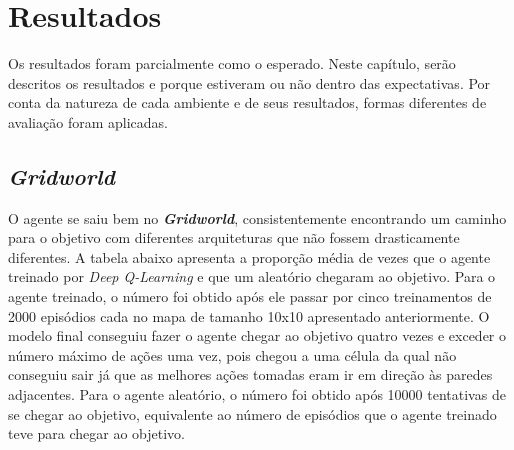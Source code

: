 
\chapter{Resultados}
\label{cap:resultados}

Os resultados foram parcialmente como o esperado.
Neste capítulo, serão descritos os resultados e porque estiveram ou não dentro das expectativas.
Por conta da natureza de cada ambiente e de seus resultados, formas diferentes de avaliação foram aplicadas.

\section{\textit{Gridworld}}
\label{sec:res_gridworld}

O agente se saiu bem no \textbf{\textit{Gridworld}}, consistentemente encontrando um caminho para o objetivo com diferentes arquiteturas que não fossem drasticamente diferentes.
A tabela abaixo apresenta a proporção média de vezes que o agente treinado por \textit{Deep Q-Learning} e que um aleatório chegaram ao objetivo.
Para o agente treinado, o número foi obtido após ele passar por cinco treinamentos de 2000 episódios cada no mapa de tamanho 10x10 apresentado anteriormente.
O modelo final conseguiu fazer o agente chegar ao objetivo quatro vezes e exceder o número máximo de ações uma vez, pois chegou a uma célula da qual não conseguiu sair já que as melhores ações tomadas eram ir em direção às paredes adjacentes.
Para o agente aleatório, o número foi obtido após 10000 tentativas de se chegar ao objetivo, equivalente ao número de episódios que o agente treinado teve para chegar ao objetivo.



